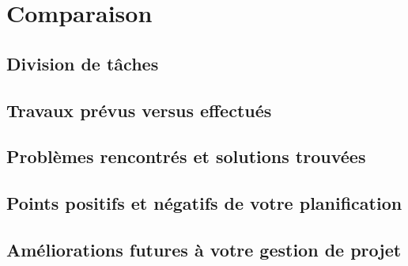 \section{Comparaison}


\subsection{Division de tâches}


\subsection{Travaux prévus versus effectués}


\subsection{Problèmes rencontrés et solutions trouvées}


\subsection{Points positifs et négatifs de votre planification}


\subsection{Améliorations futures à votre gestion de projet}

